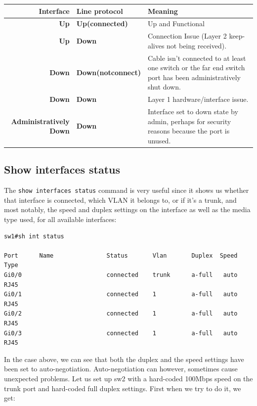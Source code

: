 \vspace{-10pt}
\begin{center}
	\begin{tabular}{rlm{}}
		\toprule
		\textbf{Interface} &\textbf{Line protocol} &\textbf{Meaning} \\
		\midrule
		\textbf{Up} &\textbf{Up(connected)} &Up and Functional\\
		\midrule
		\textbf{Up} &\textbf{Down} &Connection Issue (Layer 2 keep-alives not being received).\\
		\midrule
		\textbf{Down} &\textbf{Down(notconnect)} &Cable isn't connected to at least one switch or the far end switch port has been administratively shut down.\\
		\midrule
		\textbf{Down} &\textbf{Down} &Layer 1 hardware/interface issue.\\
		\midrule
		\textbf{Administratively Down} &\textbf{Down} &Interface set to down state by admin, perhaps for security reasons because the port is unused.\\
		\bottomrule
	\end{tabular}
\end{center}

\subsection{Show interfaces status}
The \verb|show interfaces status| command is very useful since it shows us whether that interface is connected, which VLAN it belongs to, or if it's a trunk, and most notably, the speed and duplex settings on the interface as well as the media type used, for all available interfaces:

\vspace{-15pt}
\begin{verbatim}
sw1#sh int status

Port      Name               Status       Vlan       Duplex  Speed Type
Gi0/0                        connected    trunk      a-full   auto RJ45
Gi0/1                        connected    1          a-full   auto RJ45
Gi0/2                        connected    1          a-full   auto RJ45
Gi0/3                        connected    1          a-full   auto RJ45
\end{verbatim}
\vspace{-10pt}

\noindent
In the case above, we can see that both the duplex and the speed settings have been set to auto-negotiation. Auto-negotiation can however, sometimes cause unexpected problems. Let us set up sw2 with a hard-coded 100Mbps speed on the trunk port and hard-coded full duplex settings. First when we try to do it, we get:


